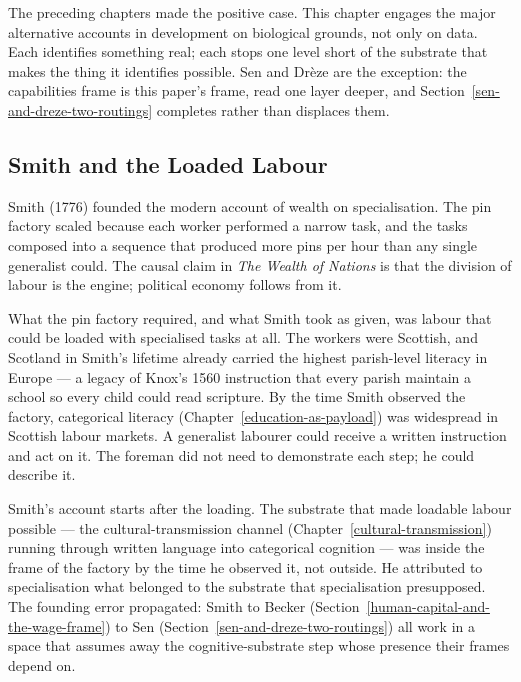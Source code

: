 \documentclass[12pt,letterpaper]{article}
\begin{document}
{\renewcommand{\thetable}{A\arabic{table}}%
\setcounter{table}{4}


The preceding chapters made the positive case. This chapter engages the major alternative accounts in development on biological grounds, not only on data. Each identifies something real; each stops one level short of the substrate that makes the thing it identifies possible. Sen and Drèze are the exception: the capabilities frame is this paper's frame, read one layer deeper, and Section~\ref{sen-and-dreze-two-routings} completes rather than displaces them.

\subsection{Smith and the Loaded Labour}\label{smith-and-the-loaded-labour}

Smith (1776) founded the modern account of wealth on specialisation. The pin factory scaled because each worker performed a narrow task, and the tasks composed into a sequence that produced more pins per hour than any single generalist could. The causal claim in \emph{The Wealth of Nations} is that the division of labour is the engine; political economy follows from it.

What the pin factory required, and what Smith took as given, was labour that could be loaded with specialised tasks at all. The workers were Scottish, and Scotland in Smith's lifetime already carried the highest parish-level literacy in Europe --- a legacy of Knox's 1560 instruction that every parish maintain a school so every child could read scripture. By the time Smith observed the factory, categorical literacy (Chapter~\ref{education-as-payload}) was widespread in Scottish labour markets. A generalist labourer could receive a written instruction and act on it. The foreman did not need to demonstrate each step; he could describe it.

Smith's account starts after the loading. The substrate that made loadable labour possible --- the cultural-transmission channel (Chapter~\ref{cultural-transmission}) running through written language into categorical cognition --- was inside the frame of the factory by the time he observed it, not outside. He attributed to specialisation what belonged to the substrate that specialisation presupposed. The founding error propagated: Smith to Becker (Section~\ref{human-capital-and-the-wage-frame}) to Sen (Section~\ref{sen-and-dreze-two-routings}) all work in a space that assumes away the cognitive-substrate step whose presence their frames depend on.

}
\end{document}
